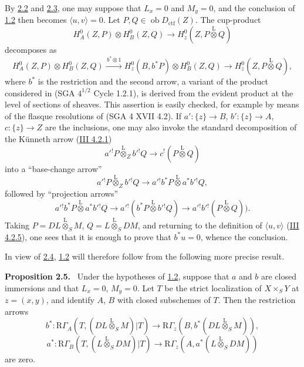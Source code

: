 \documentclass[11pt]{article}
\newenvironment{statement}[1]{\par\medskip\noindent\textbf{#1.}\ }{\par\medskip}
\providecommand{\lten}{\overset{\mathrm L}{\otimes}}
\providecommand{\Ob}{\operatorname{ob}}
\providecommand{\lten}{\overset{\mathrm L}{\otimes}}
\providecommand{\lten}{\overset{\mathrm L}{\otimes}}
\providecommand{\Ob}{\operatorname{ob}}
\providecommand{\lten}{\overset{\mathrm L}{\otimes}}
\providecommand{\lten}{\overset{\mathrm L}{\otimes}}
\providecommand{\Ob}{\operatorname{Ob}}
\providecommand{\lten}{\overset{\mathrm L}{\otimes}}
\providecommand{\Ob}{\operatorname{ob}}
\providecommand{\Ob}{\operatorname{Ob}}
\providecommand{\lten}{\overset{\mathrm L}{\otimes}}
\begin{document}
By \hyperref[sga5:IIIB:lemma:2.2]{2.2} and \hyperref[sga5:IIIB:lemma:2.3]{2.3}, one may suppose that $L_x=0$ and $M_y=0$, and the conclusion of \hyperref[sga5:IIIB:theorem:1.2]{1.2} then becomes $\langle u,v\rangle=0$. Let $P,Q\in\Ob D_{\mathrm{ctf}}(Z)$. The cup-product
\[
H_A^0(Z,P)\otimes H_B^0(Z,Q)\longrightarrow H_z^0(Z,P\lten Q)
\]
decomposes as
\[
H_A^0(Z,P)\otimes H_B^0(Z,Q)
 \xrightarrow{\,b^*\otimes 1\,}
H_z^0(B,b^*P)\otimes H_B^0(Z,Q)
 \longrightarrow H_z^0(Z,P\lten Q),
\]
where $b^*$ is the restriction and the second arrow, a variant of the product considered in (SGA $4^{1/2}$ Cycle 1.2.1), is derived from the evident product at the level of sections of sheaves. This assertion is easily checked, for example by means of the flasque resolutions of (SGA 4 XVII 4.2). If $a':\{z\}\to B$, $b':\{z\}\to A$, $c:\{z\}\to Z$ are the inclusions, one may also invoke the standard decomposition of the Künneth arrow (\hyperref[sga5:III:equation:4.2.1]{III 4.2.1})
\[
a'{}^!P\lten_Z b'{}^!Q\longrightarrow c^!(P\lten Q)
\]
into a ``base-change arrow''
\[
a'{}^!P\lten_Z b'{}^!Q\longrightarrow a'{}^!b^*P\lten a^*b'{}^!Q,
\]
followed by ``projection arrows''
\[
a'{}^!b^*P\lten a^*b'{}^!Q
 \longrightarrow a'{}^!(b^*P\lten b'{}^!Q)
 \longrightarrow a'{}^!b'{}^!(P\lten Q)).
\]
Taking $P=DL\lten_SM$, $Q=L\lten_SDM$, and returning to the definition of $\langle u,v\rangle$ (\hyperref[sga5:III:equation:4.2.5]{III 4.2.5}), one sees that it is enough to prove that $b^*u=0$, whence the conclusion.

In view of \hyperref[sga5:IIIB:lemma:2.4]{2.4}, \hyperref[sga5:IIIB:theorem:1.2]{1.2} will therefore follow from the following more precise result.

\label{sga5:IIIB:proposition:2.5}\begin{statement}{Proposition 2.5}
Under the hypotheses of \hyperref[sga5:IIIB:theorem:1.2]{1.2}, suppose that $a$ and $b$ are closed immersions and that $L_x=0$, $M_y=0$. Let $T$ be the strict localization of $X\times_SY$ at $z=(x,y)$, and identify $A$, $B$ with closed subschemes of $T$. Then the restriction arrows
\[
b^*:\mathrm R\Gamma_A(T,(DL\lten_SM)|T)
 \longrightarrow \mathrm R\Gamma_z(B,b^*(DL\lten_SM)),
\]
\[
a^*:\mathrm R\Gamma_B(T,(L\lten_SDM)|T)
 \longrightarrow \mathrm R\Gamma_z(A,a^*(L\lten_SDM))
\]
are zero.
\end{statement}
\end{document}
